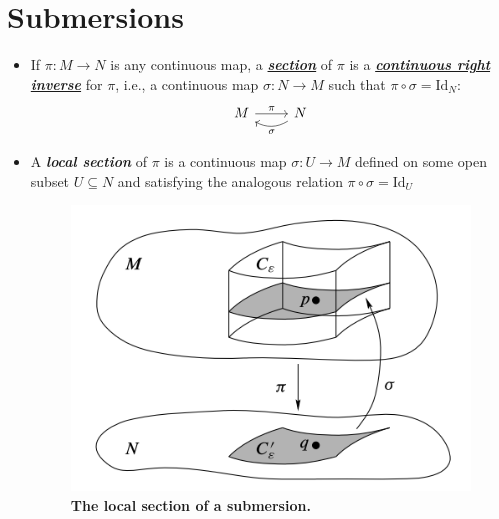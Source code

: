 \documentclass[11pt]{article}
\begin{document}
\section{Submersions}
\begin{itemize}
\item \begin{definition}
If $\pi: M \rightarrow N$ is any continuous map, a \underline{\emph{\textbf{section}}} of $\pi$ is a \underline{\emph{\textbf{continuous right inverse}}} for $\pi$, i.e., a continuous map $\sigma: N \rightarrow M$ such that $\pi \circ \sigma = \text{Id}_N$:
\[
  \begin{tikzcd}
     M  \arrow{r}{\pi}  & N   \arrow[l, bend left,  "\sigma"] 
  \end{tikzcd}
\] 
\end{definition}

\item \begin{definition}
A \emph{\textbf{local section}} of $\pi$ is a continuous map $\sigma: U \rightarrow M$ defined on some open subset $U \subseteq N$ and satisfying the analogous relation $\pi \circ \sigma = \text{Id}_U$
\end{definition}


\begin{figure}
\begin{minipage}[t]{1\linewidth}
  \centering
  \centerline{\includegraphics[scale = 0.4]{local_section_of_submersion.png}}
\end{minipage}
\caption{\footnotesize{\textbf{The local section of a submersion. \citep{lee2003introduction}}}}
\label{fig: local_section_of_submersion}
\end{figure}




\end{itemize}
\end{document}
